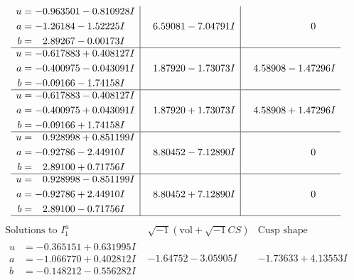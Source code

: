 \documentclass[1p]{elsarticle_modified}
\theoremstyle{definition}
\newcommand{\I}{\sqrt{-1}}
\begin{document}
$$\begin{array}{c|c|c}
\begin{aligned}
u &= -0.963501 - 0.810928 I \\
a &= -1.26184 - 1.52225 I \\
b &= \phantom{-}2.89267 - 0.00173 I\end{aligned}
 & \phantom{-}6.59081 - 7.04791 I & \phantom{-0.000000 } 0 \\ \hline\begin{aligned}
u &= -0.617883 + 0.408127 I \\
a &= -0.400975 - 0.043091 I \\
b &= -0.09166 - 1.74158 I\end{aligned}
 & \phantom{-}1.87920 - 1.73073 I & \phantom{-}4.58908 - 1.47296 I \\ \hline\begin{aligned}
u &= -0.617883 - 0.408127 I \\
a &= -0.400975 + 0.043091 I \\
b &= -0.09166 + 1.74158 I\end{aligned}
 & \phantom{-}1.87920 + 1.73073 I & \phantom{-}4.58908 + 1.47296 I \\ \hline\begin{aligned}
u &= \phantom{-}0.928998 + 0.851199 I \\
a &= -0.92786 - 2.44910 I \\
b &= \phantom{-}2.89100 + 0.71756 I\end{aligned}
 & \phantom{-}8.80452 - 7.12890 I & \phantom{-0.000000 } 0 \\ \hline\begin{aligned}
u &= \phantom{-}0.928998 - 0.851199 I \\
a &= -0.92786 + 2.44910 I \\
b &= \phantom{-}2.89100 - 0.71756 I\end{aligned}
 & \phantom{-}8.80452 + 7.12890 I & \phantom{-0.000000 } 0\\
 \hline 
 \end{array}$$\newpage$$\begin{array}{c|c|c}  
\text{Solutions to }I^u_{1}& \I (\text{vol} + \sqrt{-1}CS) & \text{Cusp shape}\\
 \hline 
\begin{aligned}
u &= -0.365151 + 0.631995 I \\
a &= -1.066770 + 0.402812 I \\
b &= -0.148212 - 0.556282 I\end{aligned}
 & -1.64752 - 3.05905 I & -1.73633 + 4.13553 I \\ \hline\begin{aligned}

\end{aligned}
\end{array}$$
\end{document}
